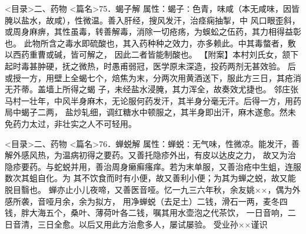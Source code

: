 \documentclass[a4paper,12pt,UTF8,twoside]{ctexbook}
\begin{document}
<目录>二、药物
<篇名>75．蝎子解
属性：蝎子∶色青，味咸（本无咸味，因皆腌以盐水，故咸），性微温。善入肝经，搜风发汗，治痉痫抽掣，中 
风口眼歪斜，或周身麻痹，其性虽毒，转善解毒，消除一切疮疡，为蜈蚣之伍药，其力相得益彰也。 
此物所含之毒水即硫酸也，其入药种种之效力，亦多赖此。中其毒螫者，敷以西药重曹或碱，皆可解之， 
因此二者皆能制酸也。 
【附案】本村刘氏女，颔下起时毒甚肿硬，抚之微热，时愚甫弱冠，医学原未深造，投药两剂无甚效验。 
后或授一方，用壁上全蝎七个，焙焦为末，分两次用黄酒送下，服此方三日，其疮消无芥蒂。盖墙上所得之蝎 
子，未经盐水浸腌，其力浑全，故奏效尤捷也。 
邻庄张马村一壮年，中风半身麻木，无论服何药发汗，其半身分毫无汗。后得一方，用药局中蝎子二两， 
盐炒轧细，调红糖水中顿服之，其半身即出汗，麻木遂愈。然未免药力太过，非壮实之人不可轻用。 

<目录>二、药物
<篇名>76．蝉蜕解
属性：蝉蜕∶无气味，性微凉。能发汗，善解外感风热，为温病初得之要药。又善托隐疹外出，有皮以达皮之力， 
故又为治隐疹要药。与蛇蜕并用，善治周身癞癣瘙痒。若为末单服，又善治疮中生蛆，连服数次其蛆自化。为 
其不饮食而时有小便，故又善利小便；为其为蝉之蜕，故又能脱目翳也。 
蝉亦止小儿夜啼，又善医音哑。忆一九三六年秋，余友姚××，偶为外感所袭，音哑月余，余为拟方， 
用净蝉蜕（去足土）二钱，滑石一两，麦冬四钱，胖大海五个，桑叶、薄荷叶各二钱，嘱其用水壶泡之代茶饮， 
一日音响，二日音清，三日全愈。以后又用此方治愈多人，屡试屡验。 
受业孙××谨识 
\end{document}

